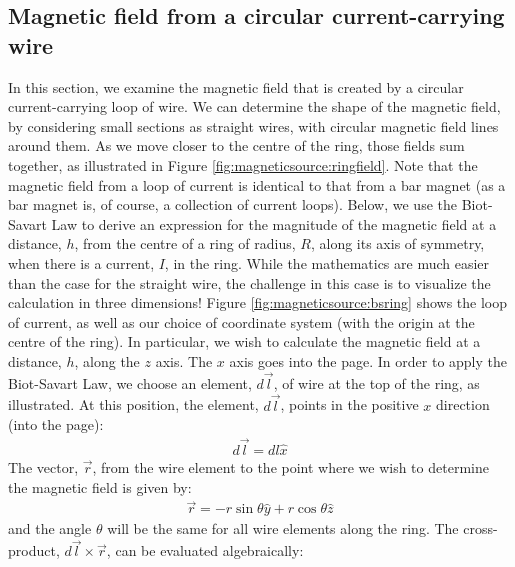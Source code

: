 \subsection{Magnetic field from a circular current-carrying wire}
In this section, we examine the magnetic field that is created by a circular current-carrying loop of wire. We can determine the shape of the magnetic field, by considering small sections as straight wires, with circular magnetic field lines around them. As we move closer to the centre of the ring, those fields sum together, as illustrated in Figure \ref{fig:magneticsource:ringfield}. Note that the magnetic field from a loop of current is identical to that from a bar magnet (as a bar magnet is, of course, a collection of current loops).   
Below, we use the Biot-Savart Law to derive an expression for the magnitude of the magnetic field at a distance, $h$, from the centre of a ring of radius, $R$, along its axis of symmetry, when there is a current, $I$, in the ring. While the mathematics are much easier than the case for the straight wire, the challenge in this case is to visualize the calculation in three dimensions! Figure \ref{fig:magneticsource:bsring} shows the loop of current, as well as our choice of coordinate system (with the origin at the centre of the ring). In particular, we wish to calculate the magnetic field at a distance, $h$, along the $z$ axis. The $x$ axis goes into the page. 
In order to apply the Biot-Savart Law, we choose an element, $d\vec l$, of wire at the top of the ring, as illustrated. At this position, the element, $d\vec l$, points in the positive $x$ direction (into the page):
\begin{align*}
d\vec l = dl \hat x
\end{align*}
The vector, $\vec r$, from the wire element to the point where we wish to determine the magnetic field is given by:
\begin{align*}
\vec r =  - r\sin\theta \hat y+r\cos\theta \hat z
\end{align*}
and the angle $\theta$ will be the same for all wire elements along the ring. The cross-product, $d\vec l \times \vec r$, can be evaluated algebraically:

